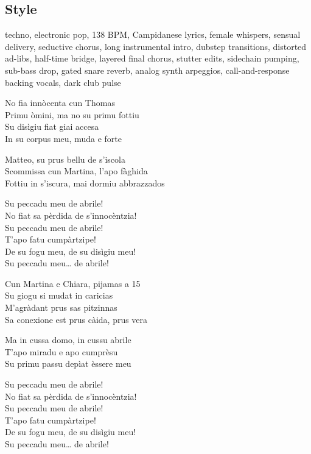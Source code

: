 \subsection{Style}
techno, electronic pop, 138 BPM, Campidanese lyrics, female whispers, sensual delivery, seductive chorus, long instrumental intro, dubstep transitions, distorted ad-libs, half-time bridge, layered final chorus, stutter edits, sidechain pumping, sub-bass drop, gated snare reverb, analog synth arpeggios, call-and-response backing vocals, dark club pulse

\begin{lyrics}

No fia innòcenta cun Thomas\\
Primu òmini, ma no su primu fottiu\\
Su disìgiu fiat giai accesa\\
In su corpus meu, muda e forte

Matteo, su prus bellu de s’iscola\\
Scommissa cun Martina, l’apo fàghida\\
Fottiu in s’iscura, mai dormiu abbrazzados

Su peccadu meu de abrile!\\
No fiat sa pèrdida de s’innocèntzia!\\
Su peccadu meu de abrile!\\
T’apo fatu cumpàrtzipe!\\
De su fogu meu, de su disìgiu meu!\\
Su peccadu meu… de abrile!

Cun Martina e Chiara, pijamas a 15\\
Su giogu si mudat in caricias\\
M’agràdant prus sas pitzinnas\\
Sa conexione est prus càida, prus vera

Ma in cussa domo, in cussu abrile\\
T’apo miradu e apo cumprèsu\\
Su primu passu depìat èssere meu

Su peccadu meu de abrile!\\
No fiat sa pèrdida de s’innocèntzia!\\
Su peccadu meu de abrile!\\
T’apo fatu cumpàrtzipe!\\
De su fogu meu, de su disìgiu meu!\\
Su peccadu meu… de abrile!


\end{lyrics}
